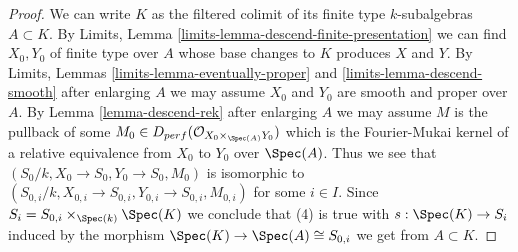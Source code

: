 \begin{proof}
\medskip\noindent
We can write $K$ as the filtered colimit of its finite type
$k$-subalgebras $A \subset K$. By
Limits, Lemma \ref{limits-lemma-descend-finite-presentation}
we can find $X_0, Y_0$ of finite type over $A$ whose
base changes to $K$ produces $X$ and $Y$.
By Limits, Lemmas
\ref{limits-lemma-eventually-proper} and \ref{limits-lemma-descend-smooth}
after enlarging $A$ we may assume $X_0$ and $Y_0$
are smooth and proper over $A$.
By Lemma \ref{lemma-descend-rek}
after enlarging $A$ we may assume $M$ is the pullback of
some $M_0  \in D_{perf}(\mathcal{O}_{X_0 \times_{\Spec(A)} Y_0})$
which is the Fourier-Mukai kernel of a relative equivalence
from $X_0$ to $Y_0$ over $\Spec(A)$.
Thus we see that $(S_0/k, X_0 \to S_0, Y_0 \to S_0, M_0)$
is isomorphic to
$(S_{0, i}/k, X_{0, i} \to S_{0, i}, Y_{0, i} \to S_{0, i}, M_{0, i})$
for some $i \in I$.
Since $S_i = S_{0, i} \times_{\Spec(k)} \Spec(K)$
we conclude that (4) is true with $s : \Spec(K) \to S_i$
induced by the morphism $\Spec(K) \to \Spec(A) \cong S_{0, i}$
we get from $A \subset K$.
\end{proof}














